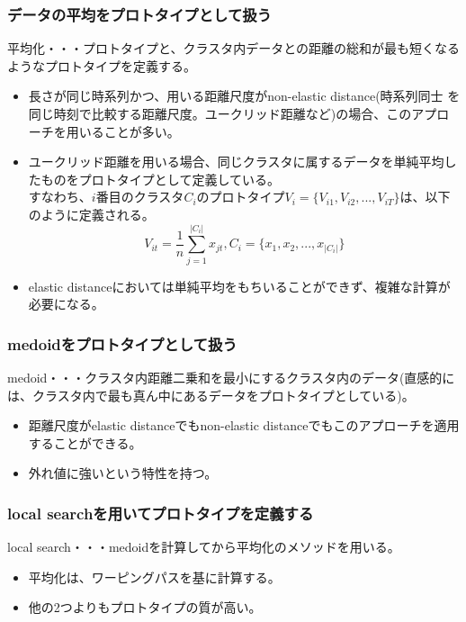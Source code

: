 \documentclass[dvipdfmx,11pt,notheorems]{beamer}
\theoremstyle{definition}
\begin{document}
\begin{frame}\frametitle{データの平均をプロトタイプとして扱う}
平均化・・・プロトタイプと、クラスタ内データとの距離の総和が最も短くなるようなプロトタイプを定義する。
\begin{itemize}
\item 長さが同じ時系列かつ、用いる距離尺度がnon-elastic distance(時系列同士
を同じ時刻で比較する距離尺度。ユークリッド距離など)の場合、このアプローチを用いることが多い。\\
\item ユークリッド距離を用いる場合、同じクラスタに属するデータを単純平均したものをプロトタイプとして定義している。\\
すなわち、$i$番目のクラスタ$C_i$のプロトタイプ$V_i = \{V_{i1},V_{i2},...,V_{iT}\} $は、以下のように定義される。
\begin{displaymath}
V_{it} = \frac{1}{n} \sum_{j=1}^{|C_i|}x_{jt}, C_i = \{x_1,x_2,...,x_{|C_i|}\}
\end{displaymath}
\item elastic distanceにおいては単純平均をもちいることができず、複雑な計算が必要になる。
\end{itemize}

\end{frame}


\begin{frame}\frametitle{medoidをプロトタイプとして扱う}
medoid・・・クラスタ内距離二乗和を最小にするクラスタ内のデータ(直感的には、クラスタ内で最も真ん中にあるデータをプロトタイプとしている)。
\begin{itemize}
\item 距離尺度がelastic distanceでもnon-elastic distanceでもこのアプローチを適用することができる。\\
\item 外れ値に強いという特性を持つ。
\end{itemize}
\end{frame}



\begin{frame}\frametitle{local searchを用いてプロトタイプを定義する}
local search・・・medoidを計算してから平均化のメソッドを用いる。\\

\begin{itemize}
\item 平均化は、ワーピングパスを基に計算する。
\item 他の2つよりもプロトタイプの質が高い。
\end{itemize}
\end{frame}
\end{document}

